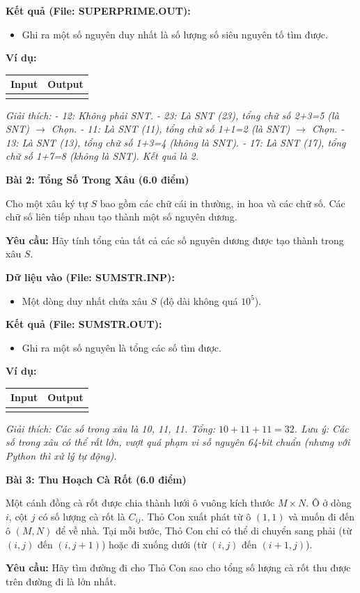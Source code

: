 \documentclass[11pt, a4paper]{article}
\newcommand{\bai}[2]{\vspace{0.5cm}\noindent\textbf{Bài #1: #2}}
\newcommand{\iobox}[2]{
    \begin{center}
    \begin{tabularx}{0.8\textwidth}{|X|X|}
    \hline
    \textbf{Input} & \textbf{Output} \\
    \hline
    \vtop{#1} & \vtop{#2} \\
    \hline
    \end{tabularx}
    \end{center}
}
\begin{document}
\textbf{Kết quả (File: SUPERPRIME.OUT):}
\begin{itemize}
    \item Ghi ra một số nguyên duy nhất là số lượng số siêu nguyên tố tìm được.
\end{itemize}

\textbf{Ví dụ:}
\iobox{
5 \newline
12 23 11 13 17
}{
2
}
\textit{Giải thích:
- 12: Không phải SNT.
- 23: Là SNT (23), tổng chữ số 2+3=5 (là SNT) $\rightarrow$ Chọn.
- 11: Là SNT (11), tổng chữ số 1+1=2 (là SNT) $\rightarrow$ Chọn.
- 13: Là SNT (13), tổng chữ số 1+3=4 (không là SNT).
- 17: Là SNT (17), tổng chữ số 1+7=8 (không là SNT).
Kết quả là 2.}

\bai{2}{Tổng Số Trong Xâu (6.0 điểm)}

Cho một xâu ký tự $S$ bao gồm các chữ cái in thường, in hoa và các chữ số. Các chữ số liên tiếp nhau tạo thành một số nguyên dương.

\textbf{Yêu cầu:} Hãy tính tổng của tất cả các số nguyên dương được tạo thành trong xâu $S$.

\textbf{Dữ liệu vào (File: SUMSTR.INP):}
\begin{itemize}
    \item Một dòng duy nhất chứa xâu $S$ (độ dài không quá $10^5$).
\end{itemize}

\textbf{Kết quả (File: SUMSTR.OUT):}
\begin{itemize}
    \item Ghi ra một số nguyên là tổng các số tìm được.
\end{itemize}

\textbf{Ví dụ:}
\iobox{
hoc10tin11lop11
}{
32
}
\textit{Giải thích: Các số trong xâu là 10, 11, 11. Tổng: $10 + 11 + 11 = 32$.
Lưu ý: Các số trong xâu có thể rất lớn, vượt quá phạm vi số nguyên 64-bit chuẩn (nhưng với Python thì xử lý tự động).}

\newpage

\bai{3}{Thu Hoạch Cà Rốt (6.0 điểm)}

Một cánh đồng cà rốt được chia thành lưới ô vuông kích thước $M \times N$. Ô ở dòng $i$, cột $j$ có số lượng cà rốt là $C_{ij}$. Thỏ Con xuất phát từ ô $(1, 1)$ và muốn đi đến ô $(M, N)$ để về nhà. Tại mỗi bước, Thỏ Con chỉ có thể di chuyển sang phải (từ $(i, j)$ đến $(i, j+1)$) hoặc đi xuống dưới (từ $(i, j)$ đến $(i+1, j)$).

\textbf{Yêu cầu:} Hãy tìm đường đi cho Thỏ Con sao cho tổng số lượng cà rốt thu được trên đường đi là lớn nhất.
\end{document}

